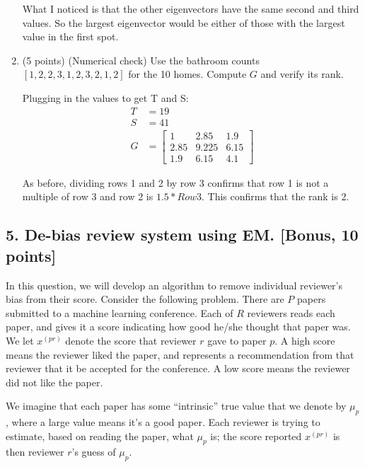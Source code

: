 \documentclass[twoside,12pt]{article}
\begin{document}
\begin{enumerate}
    What I noticed is that the other eigenvectors have the same second and third values. So the largest eigenvector would be either of those with the largest value in the first spot.

    \item (5 points) (Numerical check) Use the bathroom counts  
    \([1,2,2,3,1,2,3,2,1,2]\) for the 10 homes. Compute $G$ and verify its rank.

    Plugging in the values to get T and S:
    \begin{align*}
    T &= 19\\
    S &= 41\\
    G &= \begin{bmatrix}
        1 & 2.85 & 1.9 \\
        2.85 & 9.225 & 6.15 \\
        1.9 & 6.15 & 4.1
    \end{bmatrix}
    \end{align*}

    As before, dividing rows 1 and 2 by row 3 confirms that row 1 is not a multiple of row 3 and row 2 is $1.5*Row3$. This confirms that the rank is 2.

\end{enumerate}

\pagebreak

\subsection*{5. De-bias review system using EM. [Bonus, 10 points]} 

In this question, we will develop an algorithm to remove individual reviewer's bias from their score. Consider the following problem. There are $P$ papers submitted to a machine learning conference. Each of $R$ reviewers reads each paper, and gives it a score indicating how good he/she thought that paper was. We let $x^{(pr)}$ denote the score that reviewer $r$ gave to paper $p$. A high score means the reviewer liked the paper, and represents a recommendation from that reviewer that it be accepted for the conference. A low score means the reviewer did not like the paper.

We imagine that each paper has some ``intrinsic'' true value that we denote by $\mu_p$, where a large value means it's a good paper. Each reviewer is trying to estimate, based on reading the paper, what $\mu_p$ is; the score reported $x^{(pr)}$ is then reviewer $r$'s guess of $\mu_p$.
\end{document}
